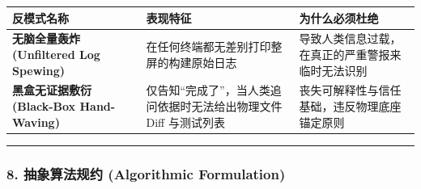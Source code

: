 {\def\LTcaptype{} %
\begin{longtable}[]{@{}
  >{\raggedright\arraybackslash}p{}
  >{\raggedright\arraybackslash}p{}
  >{\raggedright\arraybackslash}p{}@{}}
\toprule\noalign{}
\begin{minipage}[b]{\linewidth}\raggedright
反模式名称
\end{minipage} & \begin{minipage}[b]{\linewidth}\raggedright
表现特征
\end{minipage} & \begin{minipage}[b]{\linewidth}\raggedright
为什么必须杜绝
\end{minipage} \\
\midrule\noalign{}
\endhead
\bottomrule\noalign{}
\endlastfoot
\textbf{无脑全量轰炸 (Unfiltered Log Spewing)} &
在任何终端都无差别打印整屏的构建原始日志 &
导致人类信息过载，在真正的严重警报来临时无法识别 \\
\textbf{黑盒无证据敷衍 (Black-Box Hand-Waving)} &
仅告知``完成了''，当人类追问依据时无法给出物理文件 Diff 与测试列表 &
丧失可解释性与信任基础，违反物理底座锚定原则 \\
\end{longtable}
}

\begin{center}\rule{0.5\linewidth}{0.5pt}\end{center}

\subsubsection{8. 抽象算法规约 (Algorithmic
Formulation)}\label{ux62bdux8c61ux7b97ux6cd5ux89c4ux7ea6-algorithmic-formulation-14}

